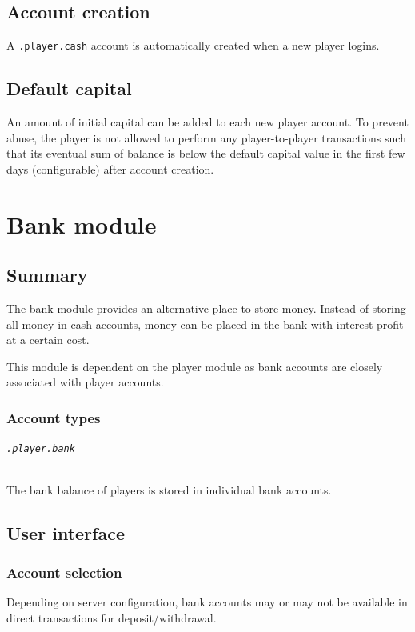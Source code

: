 \documentclass{report}
\begin{document}
		\chapter{Account creation}
			A \texttt{.player.cash} account is automatically created when a new player logins.

			\chapter{Default capital}
				An amount of initial capital can be added to each new player account.
				To prevent abuse, the player is not allowed to perform any player-to-player transactions
				such that its eventual sum of balance is below the default capital value
				in the first few days (configurable) after account creation.

	\part{Bank module}
		\chapter{Summary}
			The bank module provides an alternative place to store money.
			Instead of storing all money in cash accounts, money can be placed in the bank with interest profit at a certain cost.

			This module is dependent on the player module as bank accounts are closely associated with player accounts.

			\section{Account types}
				\paragraph{\texttt{.player.bank}}
					The bank balance of players is stored in individual bank accounts.

		\chapter{User interface}
			\section{Account selection}
				Depending on server configuration, bank accounts may or may not be available in direct transactions for deposit/withdrawal.
\end{document}
